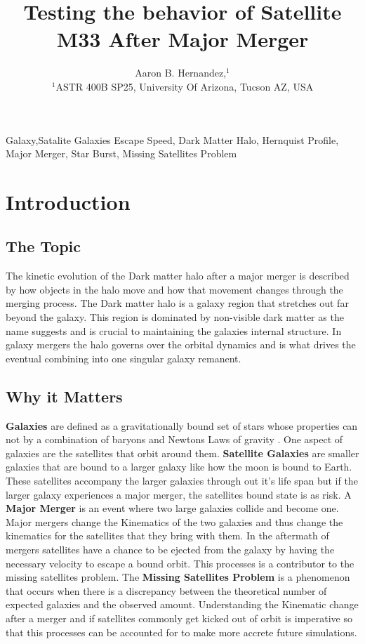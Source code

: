 \documentclass[fleqn,usenatbib]{mnras}
\title[Short title, max. 45 characters]{Testing the behavior of Satellite M33 After Major Merger}
\author[Aaron B. Hernandez et al.]{
Aaron B. Hernandez,$^{1}$
\\
$^{1}$ASTR 400B SP25, University Of Arizona, Tucson AZ, USA\\
}
\begin{document}
\label{firstpage}
\pagerange{\pageref{firstpage}--\pageref{lastpage}}
\maketitle

\begin{keywords}
Galaxy,Satalite Galaxies Escape Speed, Dark Matter Halo, Hernquist Profile, Major Merger, Star Burst, Missing Satellites Problem
\end{keywords}
\section{Introduction}
\subsection{The Topic}
The kinetic evolution of the Dark matter halo after a major merger is described by how objects in the halo move and how that movement changes through the merging process. The Dark matter halo is a galaxy region that stretches out far beyond the galaxy. This region is dominated by non-visible dark matter as the name suggests and is crucial to maintaining the galaxies internal structure. In galaxy mergers the halo governs over the orbital dynamics and is what drives the eventual combining into one singular galaxy remanent.  
\subsection{Why it Matters}
\textbf{Galaxies} are defined as a gravitationally bound set of stars whose properties can not by a combination of baryons and Newtons Laws of gravity \cite{Willman_Strader2012}. One aspect of galaxies are the satellites that orbit around them. \textbf{Satellite Galaxies} are smaller galaxies that are bound to a larger galaxy like how the moon is bound to Earth. These satellites accompany the larger galaxies through out it's life span but if the larger galaxy experiences a major merger, the satellites bound state is as risk. A \textbf{Major Merger} is an event where two large galaxies collide and become one. Major mergers change the Kinematics of the two galaxies and thus change the kinematics for the satellites that they bring with them. In the aftermath of mergers satellites have a chance to be ejected from the galaxy by having the necessary velocity to escape a bound orbit. This processes is a contributor to the missing satellites problem. The \textbf{Missing Satellites Problem} is a phenomenon that occurs when there is a discrepancy between the theoretical number of expected galaxies and the observed amount. Understanding the Kinematic change after a merger and if satellites commonly get kicked out of orbit is imperative so that this processes can be accounted for to make more accrete future simulations. 
\end{document}

